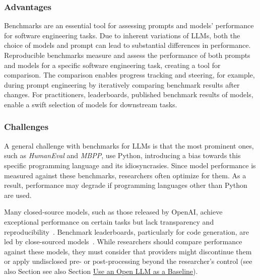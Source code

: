 
\subsubsection{Advantages}

Benchmarks are an essential tool for assessing prompts and models' performance for software engineering tasks.
Due to inherent variations of LLMs, both the choice of models and prompt can lead to substantial differences in performance.
Reproducible benchmarks measure and assess the performance of both prompts and models for a specific software engineering task, creating a tool for comparison.
The comparison enables progress tracking and steering, for example, during prompt engineering by iteratively comparing benchmark results after changes.
For practitioners, leaderboards, published benchmark results of models, enable a swift selection of models for downstream tasks.

\subsubsection{Challenges}

A general challenge with benchmarks for LLMs is that the most prominent ones, such as \emph{HumanEval} and \emph{MBPP}, use Python, introducing a bias towards this specific programming language and its idiosyncrasies.
Since model performance is measured against these benchmarks, researchers often optimize for them.
As a result, performance may degrade if programming languages other than Python are used.

Many closed-source models, such as those released by OpenAI, achieve exceptional performance on certain tasks but lack transparency and reproducibility~\cite{DBLP:conf/nips/00110ZZDJLHL24, DBLP:journals/corr/abs-2308-01861, DBLP:journals/corr/abs-2406-15877}.
Benchmark leaderboards, particularly for code generation, are led by close-sourced models~\cite{DBLP:journals/corr/abs-2308-01861, DBLP:journals/corr/abs-2406-15877}.
While researchers should compare performance against these models, they must consider that providers might discontinue them or apply undisclosed pre- or post-processing beyond the researcher's control (see also Section see also Section \href{/guidelines/#use-an-open-llm-as-a-baseline}{Use an Open LLM as a Baseline}).

